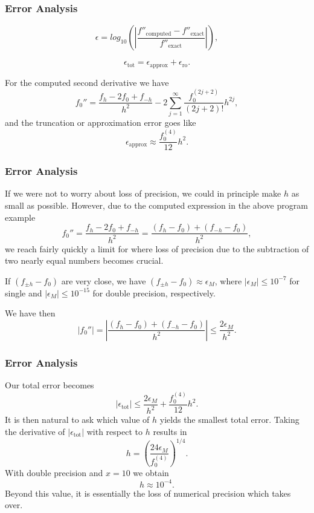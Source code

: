 \documentclass[compress]{beamer}
\begin{document}
\frame
{
  \frametitle{Error Analysis}
  \begin{block}{}
\begin{small}
{\scriptsize
\[
   \epsilon=log_{10}\left(\left|\frac{f''_{\mathrm{computed}}-f''_{\mathrm{exact}}}
                 {f''_{\mathrm{exact}}}\right|\right),
\]

\[
   \epsilon_{\mathrm{tot}}=\epsilon_{\mathrm{approx}}+\epsilon_{\mathrm{ro}}.
\]

For the computed second derivative  we have
\[
 f_0''=\frac{ f_h -2f_0 +f_{-h}}{h^2}-2\sum_{j=1}^{\infty}\frac{f_0^{(2j+2)}}{(2j+2)!}h^{2j},
\]
and the truncation or approximation error goes like
\[
  \epsilon_{\mathrm{approx}}\approx \frac{f_0^{(4)}}{12}h^{2}.
\]
}
\end{small}
  \end{block}
}


\frame
{
  \frametitle{Error Analysis}
  \begin{block}{}
\begin{small}
{\scriptsize
If we were not to worry about loss of precision, we could in principle
make $h$ as small as possible.
However, due to the computed expression in the above program example
\[
 f_0''=\frac{ f_h -2f_0 +f_{-h}}{h^2}=\frac{ (f_h -f_0) +(f_{-h}-f_0)}{h^2},
\]
we reach fairly quickly a limit for where loss of precision due to the subtraction
of two nearly equal numbers becomes crucial.


If $(f_{\pm h} -f_0)$ are very close, we have
$(f_{\pm h} -f_0)\approx \epsilon_M$, where $|\epsilon_M|\le 10^{-7}$ for single and
$|\epsilon_M|\le 10^{-15}$ for double precision, respectively.

We have then
\[
 \left|f_0''\right|=
 \left|\frac{ (f_h -f_0) +(f_{-h}-f_0)}{h^2}\right|\le \frac{ 2 \epsilon_M}{h^2}.
\]
}
\end{small}
  \end{block}
}


\frame
{
  \frametitle{Error Analysis}
  \begin{block}{}
\begin{small}
{\scriptsize
Our total error becomes
\[
   \left|\epsilon_{\mathrm{tot}}\right|\le  \frac{2 \epsilon_M}{h^2} +
                          \frac{f_0^{(4)}}{12}h^{2}.
    \label{eq:experror}
\]
It is then natural to ask which value of $h$ yields the smallest
total error. Taking the derivative of $\left|\epsilon_{\mathrm{tot}}\right|$
with respect to $h$ results in
\[
   h= \left(\frac{ 24\epsilon_M}{f_0^{(4)}}\right)^{1/4}.
\]
With double precision and $x=10$ we obtain
\[
   h\approx 10^{-4}.
\]
Beyond this value, it is essentially the loss of numerical precision
which takes over.

}
\end{small}
  \end{block}
}
\end{document}
